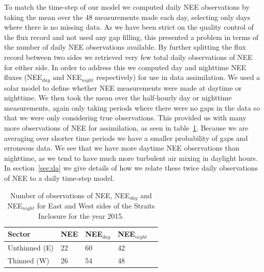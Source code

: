 \documentclass[draft,linenumbers]{agujournal}
\begin{document}
To match the time-step of our model we computed daily NEE observations by taking the mean over the 48 measurements made each day, selecting only days where there is no missing data. As we have been strict on the quality control of the flux record and not used any gap filling, this presented a problem in terms of the number of daily NEE observations available. By further splitting the flux record between two sides we retrieved very few total daily observations of NEE for either side. In order to address this we computed day and nighttime NEE fluxes (NEE\(_{day}\) and NEE\(_{night}\) respectively) for use in data assimilation. We used a solar model to define whether NEE measurements were made at daytime or nighttime. We then took the mean over the half-hourly day or nighttime measurements, again only taking periods where there were no gaps in the data so that we were only considering true observations. This provided us with many more observations of NEE for assimilation, as seen in table~\ref{table:nee_obs}. Because we are averaging over shorter time periods we have a smaller probability of gaps and erroneous data. We see that we have more daytime NEE observations than nighttime, as we tend to have much more turbulent air mixing in daylight hours. In section~\ref{sec:da} we give details of how we relate these twice daily observations of NEE to a daily time-step model.     

\begin{table}[ht] 
	\caption{Number of observations of NEE, NEE\(_{day}\) and NEE\(_{night}\) for East and West sides of the Straits Inclosure for the year 2015.}
\begin{center}
	\begin{tabular}{| l | l | l | l | l |}
	\hline
	Sector & NEE & NEE\(_{day}\) & NEE\(_{night}\)  \\ \hline
	Unthinned (E) & 22 & 60 & 42 \\ \hline
	Thinned (W) & 26 & 54 & 48 \\ \hline
	\end{tabular}
	\label{table:nee_obs}
\end{center} 
\end{table}
\end{document}
